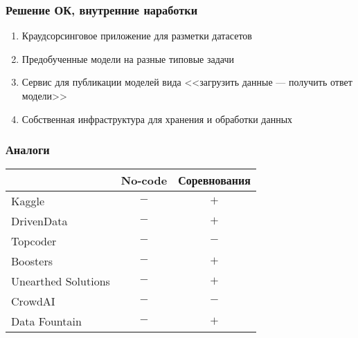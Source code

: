 \begin{frame}
\frametitle{Решение ОК, внутренние наработки}
\begin{enumerate}
    \item Краудсорсинговое приложение для разметки датасетов
    \item Предобученные модели на разные типовые задачи
    \item Сервис для публикации моделей вида <<загрузить данные --- получить ответ модели>>
    \item Собственная инфраструктура для хранения и обработки данных
\end{enumerate}
\end{frame}

\begin{frame}
\frametitle{Аналоги}
\begin{center}
    \begin{tabular}{l|cc}
        & No-code & Соревнования \\
        \hline
        Kaggle              & $-$ & $+$ \\
        DrivenData          & $-$ & $+$ \\
        Topcoder            & $-$ & $-$ \\ %
        Boosters            & $-$ & $+$ \\
        Unearthed Solutions & $-$ & $+$ \\ %
        CrowdAI             & $-$ & $-$ \\
        Data Fountain       & $-$ & $+$ \\
    \end{tabular}
\end{center}
\end{frame}
